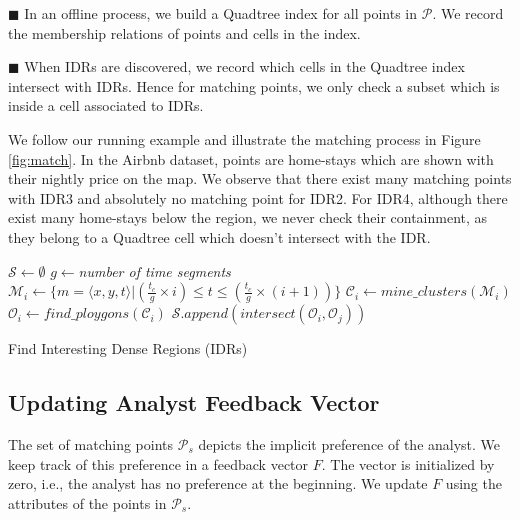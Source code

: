 \vspace{4pt}
\noindent $\blacksquare$ In an offline process, we build a Quadtree index for all points in $\mathcal{P}$. We record the membership relations of points and cells in the index.

\vspace{2pt}
\noindent $\blacksquare$ When IDRs are discovered, we record which cells in the Quadtree index intersect with IDRs. Hence for matching points, we only check a subset which is inside a cell associated to IDRs.

\vspace{4pt}
We follow our running example and illustrate the matching process in Figure \ref{fig:match}. In the Airbnb dataset, points are home-stays which are shown with their nightly price on the map. We observe that there exist many matching points with IDR3 and absolutely no matching point for IDR2. For IDR4, although there exist many home-stays below the region, we never check their containment, as they belong to a Quadtree cell which doesn't intersect with the IDR. 

\begin{algorithm}[t]
\DontPrintSemicolon
{}
$\mathcal{S} \gets \emptyset$\;
$g \gets ${\em number of time segments}\;
{
       $\mathcal{M}_i \gets \{m = \langle x,y,t \rangle | (\frac{t_c}{g} \times i) \leq t \leq (\frac{t_c}{g} \times (i+1))\}$\;
       $\mathcal{C}_i \gets \mathit{mine\_clusters}(\mathcal{M}_i)$\label{ln:mine}\;
       $\mathcal{O}_i \gets \mathit{find\_ploygons}(\mathcal{C}_i)$\label{ln:poly}\;
}
{
       $\mathcal{S}.\mathit{append}(\mathit{intersect}(\mathcal{O}_i, \mathcal{O}_j))$
}
\; 
\caption{Find Interesting Dense Regions (IDRs)}
\label{algo:dense}
\end{algorithm}

\subsection{Updating Analyst Feedback Vector}
The set of matching points $\mathcal{P}_s$ depicts the implicit preference of the analyst. We keep track of this preference in a feedback vector $F$. The vector is initialized by zero, i.e., the analyst has no preference at the beginning. We update $F$ using the attributes of the points in $\mathcal{P}_s$.

